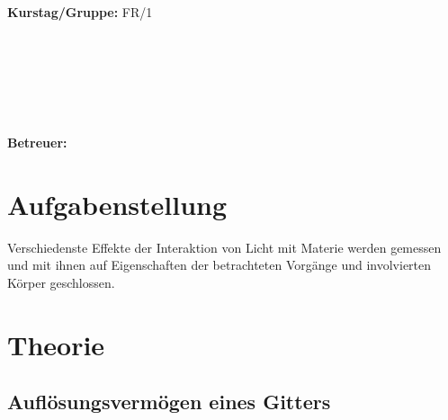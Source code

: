 \documentclass{article}
\begin{document}
\begin{verbatim}


\end{verbatim}
			\begin{flushleft}
			\textbf{\Large{Kurstag/Gruppe:}} \Large{FR/1}
			\end{flushleft}

\begin{verbatim}






\end{verbatim}
			\begin{flushleft}
			\LARGE{\textbf{Betreuer:\Large{ }}}		
			\end{flushleft}
			
\section{Aufgabenstellung}
Verschiedenste Effekte der Interaktion von Licht mit Materie werden gemessen und mit ihnen auf Eigenschaften der betrachteten Vorgänge und involvierten Körper geschlossen.

\section{Theorie}
\subsection{Auflösungsvermögen eines Gitters}
\end{document}

